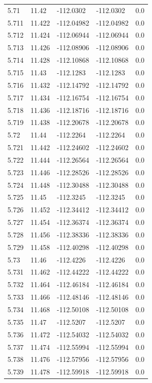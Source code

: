 \begin{tabular}{lllll}
5.71 & 11.42 & -112.0302 & -112.0302 & 0.0 \\
5.711 & 11.422 & -112.04982 & -112.04982 & 0.0 \\
5.712 & 11.424 & -112.06944 & -112.06944 & 0.0 \\
5.713 & 11.426 & -112.08906 & -112.08906 & 0.0 \\
5.714 & 11.428 & -112.10868 & -112.10868 & 0.0 \\
5.715 & 11.43 & -112.1283 & -112.1283 & 0.0 \\
5.716 & 11.432 & -112.14792 & -112.14792 & 0.0 \\
5.717 & 11.434 & -112.16754 & -112.16754 & 0.0 \\
5.718 & 11.436 & -112.18716 & -112.18716 & 0.0 \\
5.719 & 11.438 & -112.20678 & -112.20678 & 0.0 \\
5.72 & 11.44 & -112.2264 & -112.2264 & 0.0 \\
5.721 & 11.442 & -112.24602 & -112.24602 & 0.0 \\
5.722 & 11.444 & -112.26564 & -112.26564 & 0.0 \\
5.723 & 11.446 & -112.28526 & -112.28526 & 0.0 \\
5.724 & 11.448 & -112.30488 & -112.30488 & 0.0 \\
5.725 & 11.45 & -112.3245 & -112.3245 & 0.0 \\
5.726 & 11.452 & -112.34412 & -112.34412 & 0.0 \\
5.727 & 11.454 & -112.36374 & -112.36374 & 0.0 \\
5.728 & 11.456 & -112.38336 & -112.38336 & 0.0 \\
5.729 & 11.458 & -112.40298 & -112.40298 & 0.0 \\
5.73 & 11.46 & -112.4226 & -112.4226 & 0.0 \\
5.731 & 11.462 & -112.44222 & -112.44222 & 0.0 \\
5.732 & 11.464 & -112.46184 & -112.46184 & 0.0 \\
5.733 & 11.466 & -112.48146 & -112.48146 & 0.0 \\
5.734 & 11.468 & -112.50108 & -112.50108 & 0.0 \\
5.735 & 11.47 & -112.5207 & -112.5207 & 0.0 \\
5.736 & 11.472 & -112.54032 & -112.54032 & 0.0 \\
5.737 & 11.474 & -112.55994 & -112.55994 & 0.0 \\
5.738 & 11.476 & -112.57956 & -112.57956 & 0.0 \\
5.739 & 11.478 & -112.59918 & -112.59918 & 0.0 \\

\end{tabular}
